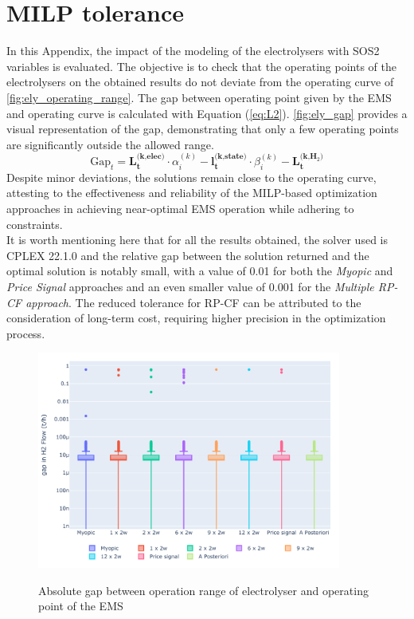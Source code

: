 \section{MILP tolerance} \label{app:MILP}
In this Appendix, the impact of the modeling of the electrolysers with SOS2 variables is evaluated. The objective is to check that the operating points of the electrolysers on the obtained results do not deviate from the operating curve of \autoref{fig:ely_operating_range}. The gap between operating point given by the EMS and operating curve is calculated with Equation (\ref{eq:L2}). \autoref{fig:ely_gap} provides a visual representation of the gap, demonstrating that only a few operating points are significantly outside the allowed range. 
\begin{equation*}
     \text{Gap}_t = \textbf{L}_\textbf{t}^{\textbf{(k,elec)}} \cdot \alpha_i^{(k)} - \textbf{l}_\textbf{t}^{\textbf{(k,state)}} \cdot \beta_i^{(k)} - \textbf{L}_\textbf{t}^{\textbf{(k,H$_2$)}}
\end{equation*}
Despite minor deviations, the solutions remain close to the operating curve, attesting to the effectiveness and reliability of the MILP-based optimization approaches in achieving near-optimal EMS operation while adhering to constraints.\\

It is worth mentioning here that for all the results obtained, the solver used is CPLEX 22.1.0 and the relative gap between the solution returned and the optimal solution is notably small, with a value of 0.01 for both the \textit{Myopic} and \textit{Price Signal} approaches and an even smaller value of 0.001 for the \textit{Multiple RP-CF approach}. The reduced tolerance for RP-CF can be attributed to the consideration of long-term cost, requiring higher precision in the optimization process.

\begin{figure}
    \centering
    \includegraphics[width=10cm]{02_Appendix/MILP_tolerance_boxplot.pdf}\\
    \caption{Absolute gap between operation range of electrolyser and operating point of the EMS}
    \label{fig:ely_gap}
\end{figure} 